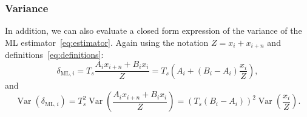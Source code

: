 \subsubsection{Variance}

\noindent
In addition, we can also evaluate a closed form expression of the variance of the ML estimator~\eqref{eq:estimator}. Again using the notation \(Z=x_i+x_{i+n}\) and definitions~\eqref{eq:definitions}:
\begin{equation}
\delta_{\mathrm{ML}, i}=T_s\frac{A_i x_{i+n}+B_i x_i}{Z}=T_s\left(A_i+\left(B_i-A_i\right) \frac{x_i}{Z}\right),
\end{equation}
and
\begin{equation}
\operatorname{Var}\left(\delta_{\mathrm{ML},i}\right)
=T_s^2\operatorname{Var}\left(\frac{A_i x_{i+n}+B_i x_i}{Z}\right)
=\left(T_s\left(B_i-A_i\right)\right)^2\operatorname{Var}\left(\frac{x_i}{Z}\right).
\label{eq:thefirst}
\end{equation}

